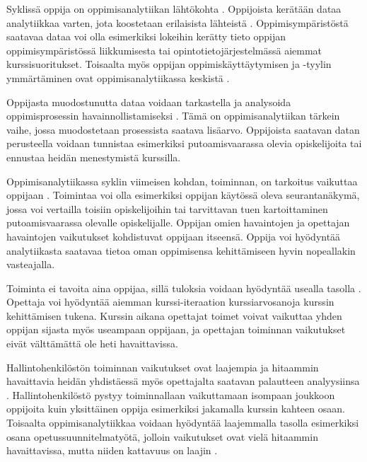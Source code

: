 Syklissä oppija on oppimisanalytiikan lähtökohta \citep{clowLearningAnalyticsCycle2012}. Oppijoista kerätään dataa analytiikkaa varten, jota koostetaan erilaisista lähteistä \citep{wolffImprovingRetentionPredicting2013}. Oppimisympäristöstä saatavaa dataa voi olla esimerkiksi lokeihin kerätty tieto oppijan oppimisympäristössä liikkumisesta tai opintotietojärjestelmässä aiemmat kurssisuoritukset. Toisaalta myös oppijan oppimiskäyttäytymisen ja -tyylin ymmärtäminen ovat oppimisanalytiikassa keskistä \citep{hasanPredictingStudentPerformance2020}.

Oppijasta muodostunutta dataa voidaan tarkastella ja analysoida oppimisprosessin havainnollistamiseksi \citep{clowLearningAnalyticsCycle2012}. Tämä on oppimisanalytiikan tärkein vaihe, jossa muodostetaan prosessista saatava lisäarvo. Oppijoista saatavan datan perusteella voidaan tunnistaa esimerkiksi putoamisvaarassa olevia opiskelijoita tai ennustaa heidän menestymistä kurssilla.

Oppimisanalytiikassa syklin viimeisen kohdan, toiminnan, on tarkoitus vaikuttaa oppijaan \citep{clowLearningAnalyticsCycle2012}. Toimintaa voi olla esimerkiksi oppijan käytössä oleva seurantanäkymä, jossa voi vertailla toisiin opiskelijoihin tai tarvittavan tuen kartoittaminen putoamisvaarassa olevalle opiskelijalle. Oppijan omien havaintojen ja opettajan havaintojen vaikutukset kohdistuvat oppijaan itseensä. Oppija voi hyödyntää analytiikasta saatavaa tietoa oman oppimisensa kehittämiseen hyvin nopeallakin vasteajalla.

Toiminta ei tavoita aina oppijaa, sillä tuloksia voidaan hyödyntää usealla tasolla \citep{clowLearningAnalyticsCycle2012}. Opettaja voi hyödyntää aiemman kurssi-iteraation kurssiarvosanoja kurssin kehittämisen tukena. Kurssin aikana opettajat toimet voivat vaikuttaa yhden oppijan sijasta myös useampaan oppijaan, ja opettajan toiminnan vaikutukset eivät välttämättä ole heti havaittavissa.

Hallintohenkilöstön toiminnan vaikutukset ovat laajempia ja hitaammin havaittavia heidän yhdistäessä myös opettajalta saatavan palautteen analyysiinsa \citep{clowLearningAnalyticsCycle2012}. Hallintohenkilöstö pystyy toiminnallaan vaikuttamaan isompaan joukkoon oppijoita kuin yksittäinen oppija esimerkiksi jakamalla kurssin kahteen osaan. Toisaalta oppimisanalytiikkaa voidaan hyödyntää laajemmalla tasolla esimerkiksi osana opetussuunnitelmatyötä, jolloin vaikutukset ovat vielä hitaammin havaittavissa, mutta niiden kattavuus on laajin \citep{clowOverviewLearningAnalytics2013}.

